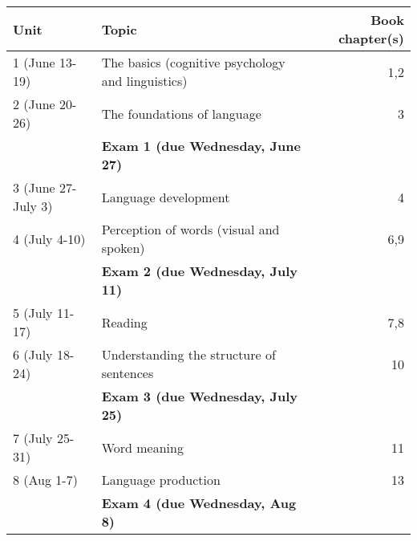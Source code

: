 \documentclass[10pt]{article}
\begin{document}
\begin{center}
\begin{tabular}{llr}
Unit & Topic & Book chapter(s)\\
\hline
1 (June 13-19) & The basics (cognitive psychology and linguistics) & 1,2\\
2 (June 20-26) & The foundations of language & 3\\
 & \textbf{Exam 1 (due Wednesday, June 27)} & \\
3 (June 27-July 3) & Language development & 4\\
4 (July 4-10) & Perception of words (visual and spoken) & 6,9\\
 & \textbf{Exam 2 (due Wednesday, July 11)} & \\
5 (July 11-17) & Reading & 7,8\\
6 (July 18-24) & Understanding the structure of sentences & 10\\
 & \textbf{Exam 3 (due Wednesday, July 25)} & \\
7 (July 25-31) & Word meaning & 11\\
8 (Aug 1-7) & Language production & 13\\
 & \textbf{Exam 4 (due Wednesday, Aug 8)} & \\
\end{tabular}
\end{center}
\end{document}
